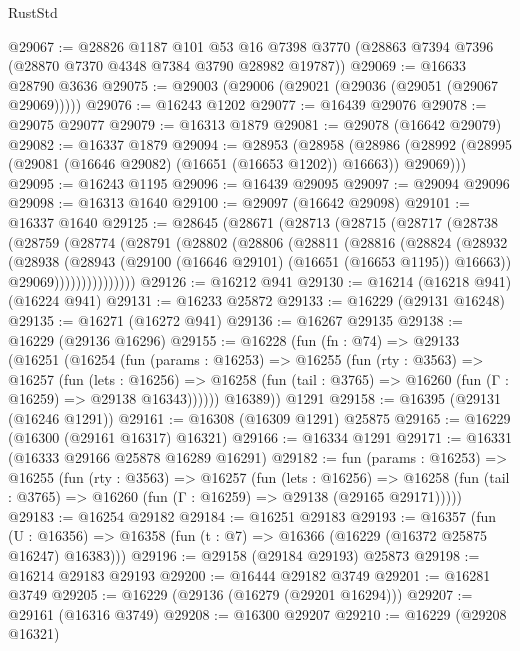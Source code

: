 \begin{lexlean}{RustStd}
\begin{coremodule}
@29067 := @28826
    @1187
    @101
    @53
    @16
    @7398
    @3770
    (@28863 @7394 @7396 (@28870 @7370 @4348 @7384 @3790 @28982 @19787))
@29069 := @16633 @28790 @3636
@29075 := @29003 (@29006 (@29021 (@29036 (@29051 (@29067 @29069)))))
@29076 := @16243 @1202
@29077 := @16439 @29076
@29078 := @29075 @29077
@29079 := @16313 @1879
@29081 := @29078 (@16642 @29079)
@29082 := @16337 @1879
@29094 := @28953
    (@28958
      (@28986 (@28992 (@28995 (@29081 (@16646 @29082) (@16651 (@16653 @1202)) @16663)) @29069)))
@29095 := @16243 @1195
@29096 := @16439 @29095
@29097 := @29094 @29096
@29098 := @16313 @1640
@29100 := @29097 (@16642 @29098)
@29101 := @16337 @1640
@29125 := @28645
    (@28671
      (@28713
        (@28715
          (@28717
            (@28738
              (@28759
                (@28774
                  (@28791
                    (@28802
                      (@28806
                        (@28811
                          (@28816
                            (@28824
                              (@28932
                                (@28938
                                  (@28943 (@29100 (@16646 @29101) (@16651 (@16653 @1195)) @16663))
                                  @29069)))))))))))))))
@29126 := @16212 @941
@29130 := @16214 (@16218 @941) (@16224 @941)
@29131 := @16233 @25872
@29133 := @16229 (@29131 @16248)
@29135 := @16271 (@16272 @941)
@29136 := @16267 @29135
@29138 := @16229 (@29136 @16296)
@29155 := @16228
    (fun (fn : @74) =>
    @29133
      (@16251
        (@16254
          (fun (params : @16253) =>
          @16255
            (fun (rty : @3563) =>
            @16257
              (fun (lets : @16256) =>
              @16258 (fun (tail : @3765) => @16260 (fun (Γ : @16259) => @29138 @16343))))))
        @16389))
    @1291
@29158 := @16395 (@29131 (@16246 @1291))
@29161 := @16308 (@16309 @1291) @25875
@29165 := @16229 (@16300 (@29161 @16317) @16321)
@29166 := @16334 @1291
@29171 := @16331 (@16333 @29166 @25878 @16289 @16291)
@29182 := fun (params : @16253) =>
  @16255
    (fun (rty : @3563) =>
    @16257
      (fun (lets : @16256) =>
      @16258 (fun (tail : @3765) => @16260 (fun (Γ : @16259) => @29138 (@29165 @29171)))))
@29183 := @16254 @29182
@29184 := @16251 @29183
@29193 := @16357
    (fun (U : @16356) => @16358 (fun (t : @7) => @16366 (@16229 (@16372 @25875 @16247) @16383)))
@29196 := @29158 (@29184 @29193) @25873
@29198 := @16214 @29183 @29193
@29200 := @16444 @29182 @3749
@29201 := @16281 @3749
@29205 := @16229 (@29136 (@16279 (@29201 @16294)))
@29207 := @29161 (@16316 @3749)
@29208 := @16300 @29207
@29210 := @16229 (@29208 @16321)

\end{coremodule}
\end{lexlean}
